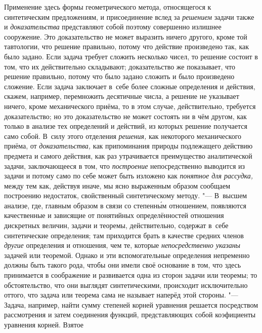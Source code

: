 Применение здесь формы геометрического метода, относящегося к синтетическим
предложениям, и присоединение вслед за {\em решением} задачи также и {\em
доказательства} представляют собой поэтому совершенно излишнее сооружение. Это
доказательство не может выразить ничего другого, кроме той тавтологии, что
решение правильно, потому что действие произведено так, как было задано. Если
задача требует сложить несколько чисел, то решение состоит в том, что их
действительно складывают; доказательство же показывает, что решение правильно,
потому что было задано сложить и было произведено сложение. Если задача
заключает в~себе более сложные определения и действия, скажем, например,
перемножить десятичные числа, а решение не указывает ничего, кроме механического
приёма, то в этом случае, действительно, требуется доказательство; но это
доказательство не может состоять ни в чём другом, как только в анализе тех
определений и действий, из которых решение получается само собой. В~силу этого
отделения {\em решения,} как некоторого механического приёма, от
{\em доказательства,} как припоминания природы подлежащего действию предмета и
самого действия, как раз утрачивается преимущество аналитической задачи,
заключающееся в том, что {\em построение} непосредственно выводится из задачи и
потому само по себе может быть изложено как {\em понятное для рассудка,} между
тем как, действуя иначе, мы ясно выраженным образом сообщаем построению
недостаток, свойственный синтетическому методу. "--- В~высшем анализе, где,
главным образом в связи со степенн\'{ы}м отношением, появляются качественные и
зависящие от понятийных определённостей отношения дискретных величин, задачи и
теоремы, действительно, содержат в~себе синтетические определения; там
приходится брать в качестве средних членов {\em другие} определения и
отношения, чем те, которые {\em непосредственно указаны} задачей или теоремой.
Однако и эти вспомогательные определения непременно должны быть такого рода,
чтобы они имели своё основание в том, что здесь принимается в соображение и
развивается одна из сторон задачи или теоремы; то обстоятельство, что они
выглядят синтетическими, происходит исключительно оттого, что задача или
теорема сама не называет наперёд этой стороны. "--- Задача, например, найти
сумму степеней корней уравнения решается посредством рассмотрения и затем
соединения функций, представляющих собой коэфициенты уравнения корней. Взятое
